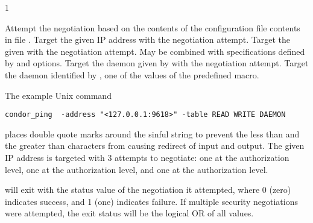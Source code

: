 \begin{ManPage}{\label{man-condor-ping}}{1}
\begin{Options}
  \ToolArgsBaseDesc
    {Attempt the negotiation based on the contents of the configuration file
    contents in file .  }
    {Target the given IP address with the negotiation attempt.  }
    {Target the given  with the negotiation attempt. 
    May be combined with specifications defined by  
    and  options. }
    {Target the daemon given by  with the negotiation attempt. 
    }
    {Target the daemon identified by , 
    one of the values of the predefined  macro. }
\end{Options}

\Examples

The example Unix command
\begin{verbatim}
condor_ping  -address "<127.0.0.1:9618>" -table READ WRITE DAEMON
\end{verbatim}
places double quote marks around the sinful string to prevent the
less than and the greater than characters from causing redirect of
input and output.
The given IP address is targeted with 3 attempts to negotiate:
one at the  authorization level, 
one at the  authorization level, 
and one at the  authorization level.

\ExitStatus

 will exit with the status value of the negotiation
it attempted,
where 0 (zero) indicates success, and 1 (one) indicates failure.
If multiple security negotiations were attempted, 
the exit status will be the logical OR of all values.

\end{ManPage}
